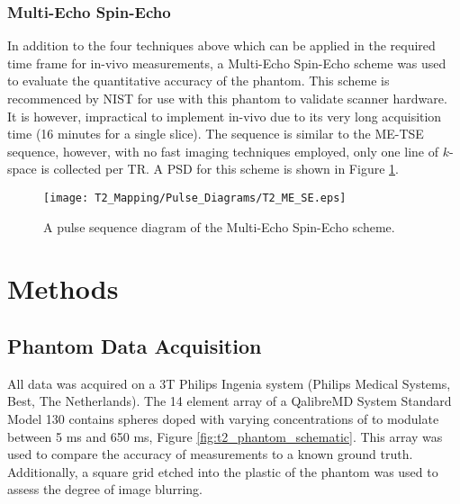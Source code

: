 \subsubsection{Multi-Echo Spin-Echo}
In addition to the four techniques above which can be applied in the required time frame for in-vivo measurements, a Multi-Echo Spin-Echo scheme was used to evaluate the quantitative accuracy of the phantom. This scheme is recommenced by \ac{NIST} for use with this phantom to validate scanner hardware. It is however, impractical to implement in-vivo due to its very long acquisition time (16 minutes for a single slice). The sequence is similar to the \ac{ME-TSE} sequence, however, with no fast imaging techniques employed, only one line of $k$-space is collected per \ac{TR}. A \ac{PSD} for this scheme is shown in Figure \ref{fig:t2_me-se_seq}.

\begin{figure}[H]
	\centering
	\texttt{[image: T2\_Mapping/Pulse\_Diagrams/T2\_ME\_SE.eps]}
	\caption{A pulse sequence diagram of the Multi-Echo Spin-Echo scheme.}
	\label{fig:t2_me-se_seq}	
\end{figure}

\newpage

\section{Methods}
\label{sec:t2_methods}

\subsection{Phantom Data Acquisition}

All data was acquired on a 3T Philips Ingenia system (Philips Medical Systems, Best, The Netherlands). The 14 element \ttwo array of a QalibreMD System Standard Model 130 contains spheres doped with varying concentrations of  to modulate \ttwo between 5 ms and 650 ms, Figure \ref{fig:t2_phantom_schematic}. This array was used to compare the accuracy of \ttwo measurements to a known ground truth. Additionally, a square grid etched into the plastic of the phantom was used to assess the degree of image blurring. 

